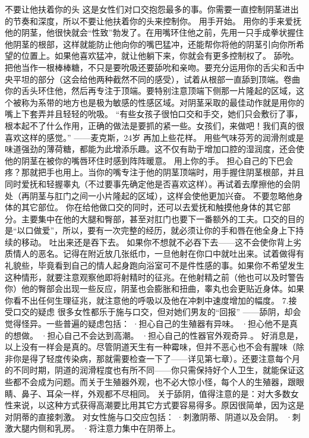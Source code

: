 \documentclass[12pt,UTF8]{ctexbook}
\begin{document}
不要让他扶着你的头
这是女性们对口交抱怨最多的事。你需要一直控制阴茎进出的节奏和深度，所以不要让他扶着你的头来控制你。
用手开始。
用你的手来爱抚他的阴茎，他很快就会“性致”勃发了。在用嘴环住他之前，先用一只手成拳状握住他阴茎的根部，这样就能防止他向你的嘴巴猛冲，还能帮你将他的阴茎引向你所希望的位置上。如果他喜欢猛冲，就让他躺下来，你就会有更多控制权了。
舔吮。
把他当作一根棒棒糖，不只是要吮吸还要舔吮和亲吻。要充分运用你的舌尖和舌中央平坦的部分（这会给他两种截然不同的感受），试着从根部一直舔到顶端。卷曲你的舌头环住他，然后再专注于顶端。要特别注意顶端下侧那一片隆起的区域，这个被称为系带的地方也是极为敏感的性感区域。对阴茎采取的最佳动作就是用你的嘴上下套弄并且轻轻的吮吸。
“有些女孩子很怕口交和手交，她们只会敷衍了事，根本起不了什么作用，正确的做法是要抓的紧一些。女孩们，来做吧！我们真的很喜欢这样的感觉。”
——麦克斯，24岁
再加上些花样。
用些气味芬芳的润滑剂或是味道强劲的薄荷糖，都能为此增添乐趣。这不仅有助于增加口腔的湿润度，还会使他的阴茎在被你的嘴唇环住时感到阵阵暖意。
用上你的手。
担心自己的下巴会疼？那就把手也用上。当你的嘴专注于他的阴茎顶端时，用手握住阴茎根部，并且同时爱抚和轻握睾丸（不过要事先确定他是否喜欢这样）。再试着去摩擦他的会阴处（再阴茎与肛门之间一小片隆起的区域），这样会使他更加兴奋。
不要忽略他身体的其它部位。
你在给他做口交的同时，还可以去爱抚和触摸他身体的其它部分。主要集中在他的大腿和臀部，甚至对肛门也要下一番额外的工夫。口交的目的是“以口做爱”，所以，要有一次完整的经历，就必须让你的手和唇在他全身上下持续的移动。
吐出来还是吞下去。
如果你不想就不必吞下去——这不会使你背上劣质情人的恶名。记得在附近放几张纸巾，一旦他射在你口中就吐出来。试着做得有礼貌些，毕竟看到自己的情人起身跑向浴室可不是件性感的事。如果你不希望发生这种情形，就要注意观察他即将射精时的征兆。在他射精之前（他也可以及时警告你）他的臀部会出现一些反应，阴茎也会膨胀和扭曲，睾丸也会更贴近身体。如果你看不出任何生理征兆，就注意他的呼吸以及他在冲刺中速度增加的幅度。
7.接受口交的疑虑
很多女性都乐于施与口交，但对她们男友的“回报” ——舔阴，却会觉得怪异。一些普遍的疑虑包括：
·担心自己的生殖器有异味。
·担心他不是真的想做。
·担心自己不会达到高潮。
·担心自己的性器官外观奇异.。
好消息是，以上没有一样会是真的。尽管阴道天生有一种霉味，但并不恶心也不会有腥味（除非你是得了轻度传染病，那就需要检查一下了——详见第七章）。还要注意每个月的不同时期，阴道的润滑程度也有所不同——你只需保持好个人卫生，就能保证这些都不会成为问题。而关于生殖器外观，也不必大惊小怪，每个人的生殖器，跟眼睛、鼻子、耳朵一样，外观都不尽相同。
关于舔阴，值得注意的是：对大多数女性来说，以这种方式获得高潮要比用其它方式要容易得多。原因很简单，因为这是对阴蒂的直接刺激。
对女性施与口交应包括：
·刺激阴蒂、阴道以及会阴。
·刺激大腿内侧和乳房。
·将注意力集中在阴蒂上。
\end{document}

